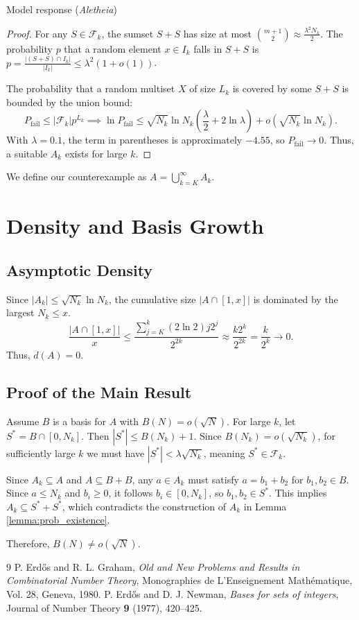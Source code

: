 \documentclass[11pt]{article}
\begin{document}
\begin{solution}{Model response (\textit{Aletheia})}
\begin{proof}
For any $S \in \mathcal{F}_k$, the sumset $S+S$ has size at most $\binom{m+1}{2} \approx \frac{\lambda^2 N_k}{2}$. The probability $p$ that a random element $x \in I_k$ falls in $S+S$ is $p = \frac{|(S+S) \cap I_k|}{|I_k|} \le \lambda^2 (1 + o(1))$.

The probability that a random multiset $X$ of size $L_k$ is covered by some $S+S$ is bounded by the union bound:
\[
P_{\text{fail}} \le |\mathcal{F}_k| p^{L_k} \implies \ln P_{\text{fail}} \le \sqrt{N_k} \ln N_k \left( \frac{\lambda}{2} + 2 \ln \lambda \right) + o(\sqrt{N_k} \ln N_k).
\]
With $\lambda = 0.1$, the term in parentheses is approximately $-4.55$, so $P_{\text{fail}} \to 0$. Thus, a suitable $A_k$ exists for large $k$.
\end{proof}

We define our counterexample as $A = \bigcup_{k=K}^{\infty} A_k$.

\section{Density and Basis Growth}

\subsection{Asymptotic Density}
Since $|A_k| \le \sqrt{N_k} \ln N_k$, the cumulative size $|A \cap [1, x]|$ is dominated by the largest $N_k \le x$.
\[
\frac{|A \cap [1, x]|}{x} \le \frac{\sum_{j=K}^k (2 \ln 2) j 2^j}{2^{2k}} \approx \frac{k 2^k}{2^{2k}} = \frac{k}{2^k} \to 0.
\]
Thus, $d(A) = 0$.

\subsection{Proof of the Main Result}
Assume $B$ is a basis for $A$ with $B(N) = o(\sqrt{N})$. For large $k$, let $S^* = B \cap [0, N_k]$. Then $|S^*| \le B(N_k) + 1$. Since $B(N_k) = o(\sqrt{N_k})$, for sufficiently large $k$ we must have $|S^*| < \lambda \sqrt{N_k}$, meaning $S^* \in \mathcal{F}_k$.

Since $A_k \subseteq A$ and $A \subseteq B+B$, any $a \in A_k$ must satisfy $a = b_1 + b_2$ for $b_1, b_2 \in B$. Since $a \le N_k$ and $b_i \ge 0$, it follows $b_i \in [0, N_k]$, so $b_1, b_2 \in S^*$. This implies $A_k \subseteq S^* + S^*$, which contradicts the construction of $A_k$ in Lemma \ref{lemma:prob_existence}.

Therefore, $B(N) \neq o(\sqrt{N})$.

\begin{thebibliography}{9}
P. Erdős and R. L. Graham, \textit{Old and New Problems and Results in Combinatorial Number Theory}, Monographies de L'Enseignement Mathématique, Vol. 28, Geneva, 1980.
P. Erdős and D. J. Newman, \textit{Bases for sets of integers}, Journal of Number Theory \textbf{9} (1977), 420--425.
\end{thebibliography}
\end{solution}
\end{document}
